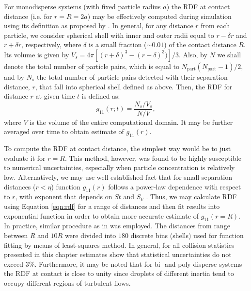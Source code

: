 \documentclass{pracamgren}
\begin{document}
For monodisperse systems (with fixed particle radius $a$) the RDF at contact distance (i.e. for $r = R = 2a$) may be effectively computed during simulation using its definition as proposed by \textcite{Wang2000,Zhou2001}.
In general, for any distance $r$ from each particle, we consider spherical shell with inner and outer radii equal to $r - \delta r$ and $r + \delta r$, respectively, where $\delta$ is a small fraction ($\sim 0.01$) of the contact distance $R$.
Its volume is given by $V_s = 4 \pi [(r + \delta)^3 - (r - \delta)^3)] / 3$.
Also, by $N$ we shall denote the total number of particle pairs, which is equal to $N_{\text{part}}(N_{\text{part}} - 1) / 2$, and by $N_s$ the total number of particle pairs detected with their separation distance, $r$, that fall into spherical shell defined as above.
Then, the RDF for distance $r$ at given time $t$ is defined as: 
\begin{equation}
g_{11}(r; t) = \frac{N_s / V_s}{N / V} ,
\label{eqn:rdf}
\end{equation}
where $V$ is the volume of the entire computational domain.
It may be further averaged over time to obtain estimate of $g_{11}(r)$.

To compute the RDF at contact distance, the simplest way would be to just evaluate it for ${r = R}$.
This method, however, was found to be highly susceptible to numerical uncertainties, especially when particle concentration is relatively low.
Alternatively, we may use well established fact that for small separation distances ($r < \eta$) function $g_{11}(r)$ follows a power-law dependence with respect to $r$, with exponent that depends on $St$ and $S_V$ \parencite[Equation 11 therein]{Rosa2013}.
Thus, we may calculate RDF using Equation \ref{eqn:rdf} for a range of distances and then fit results into exponential function in order to obtain more accurate estimate of $g_{11}(r = R)$.
In practice, similar procedure as in \textcite{Rosa2013} was employed.
The distances from range between $R$ and $10R$ were divided into $180$ discrete bins (shells) used for function fitting by means of least-squares method.
In general, for all collision statistics presented in this chapter estimates show that statistical uncertainties do not exceed $3 \%$.
Furthermore, it may be noted that for bi- and poly-disperse systems the RDF at contact is close to unity since droplets of different inertia tend to occupy different regions of turbulent flows.
\end{document}
